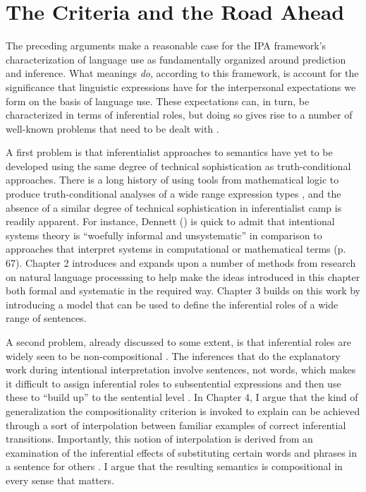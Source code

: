 \section{The Criteria and the Road Ahead}

The preceding arguments make a reasonable case for the IPA framework's characterization of language use as fundamentally organized around prediction and inference. What meanings \textit{do}, according to this framework, is account for the significance that linguistic expressions have for the interpersonal expectations we form on the basis of language use. These expectations can, in turn, be characterized in terms of inferential roles, but doing so gives rise to a number of well-known problems that need to be dealt with \citep{FodorLepore:1991,FodorLepore:2002}.

A first problem is that inferentialist approaches to semantics have yet to be developed using the same degree of technical sophistication as truth-conditional approaches. There is a long history of using tools from mathematical logic to produce truth-conditional analyses of a wide range expression types \citep[e.g.,][]{Carpenter:1997}, and the absence of a similar degree of technical sophistication in inferentialist camp is readily apparent. For instance, Dennett (\citeyear{Dennett:1987}) is quick to admit that intentional systems theory is ``woefully informal and unsystematic'' in comparison to approaches that interpret systems in computational or mathematical terms (p. 67). Chapter 2 introduces and expands upon a number of methods from research on natural language processsing to help make the ideas introduced in this chapter both formal and systematic in the required way. Chapter 3 builds on this work by introducing a model that can be used to define the inferential roles of a wide range of sentences. 

A second problem, already discussed to some extent, is that inferential roles are widely seen to be non-compositional \citep{FodorLepore:2002,Fodor:1998,MargolisLaurence:1999}. The inferences that do the explanatory work during intentional interpretation involve sentences, not words, which makes it difficult to assign inferential roles to subsentential expressions and then use these to ``build up'' to the sentential level \citep{Brandom:1994}. In Chapter 4, I argue that the kind of generalization the compositionality criterion is invoked to explain can be achieved through a sort of interpolation between familiar examples of correct inferential transitions. Importantly, this notion of interpolation is derived from an examination of the inferential effects of substituting certain words and phrases in a sentence for others \citep{Brandom:1994}. I argue that the resulting semantics is compositional in every sense that matters.

